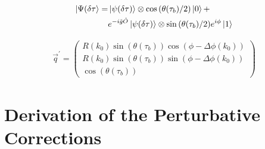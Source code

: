 \documentclass[10pt,
 amsmath,amssymb,
 aps,prb, twocolumn
]{revtex4-2}
\begin{document}
\begin{align}\label{eq:entangled_state}
    \ket{\Psi (\delta\tau} = & \ket{\psi(\delta \tau)} \otimes \cos{(\theta(\tau_b)/2)}\ket{0} +  \nonumber \\ 
    & e^{-i\tilde{g}\hat{O}}\ket{\psi(\delta \tau)} \otimes \sin{(\theta(\tau_b)/2)} e^{i \phi}\ket{1}
\end{align}

\begin{align}\label{eq:new_q}
 \vec{q}^\prime = 
    \begin{pmatrix}
    R(k_0) \sin(\theta(\tau_b)) \cos(\phi - \Delta \phi(k_0)) \\
    R(k_0) \sin(\theta(\tau_b)) \sin(\phi - \Delta \phi(k_0)) \\
    \cos(\theta(\tau_b))
    \end{pmatrix}
\end{align}

\section{Derivation of the Perturbative Corrections}\label{app:derivation_perturbative}

  
\end{document}
